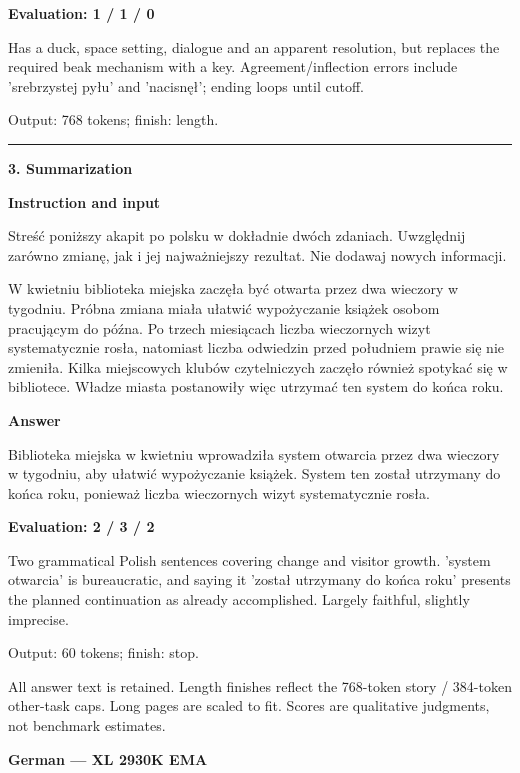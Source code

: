 \documentclass[10pt]{article}
\begin{document}
{\begin{minipage}{\textwidth}
\textbf{Evaluation: 1 / 1 / 0}\par Has a duck, space setting, dialogue and an apparent resolution, but replaces the required beak mechanism with a key. Agreement/inflection errors include 'srebrzystej pyłu' and 'nacisnęł'; ending loops until cutoff.
\par {\color{gray} Output: 768 tokens; finish: length.}\par
\medskip\hrule\smallskip
{\bfseries 3. Summarization}\par\smallskip
\textbf{Instruction and input}\par Streść poniższy akapit po polsku w dokładnie dwóch zdaniach. Uwzględnij zarówno zmianę, jak i jej najważniejszy rezultat. Nie dodawaj nowych informacji.
\par\smallskip
W kwietniu biblioteka miejska zaczęła być otwarta przez dwa wieczory w tygodniu. Próbna zmiana miała ułatwić wypożyczanie książek osobom pracującym do późna. Po trzech miesiącach liczba wieczornych wizyt systematycznie rosła, natomiast liczba odwiedzin przed południem prawie się nie zmieniła. Kilka miejscowych klubów czytelniczych zaczęło również spotykać się w bibliotece. Władze miasta postanowiły więc utrzymać ten system do końca roku.\par\smallskip
\textbf{Answer}\par Biblioteka miejska w kwietniu wprowadziła system otwarcia przez dwa wieczory w tygodniu, aby ułatwić wypożyczanie książek. System ten został utrzymany do końca roku, ponieważ liczba wieczornych wizyt systematycznie rosła.\par\smallskip
\textbf{Evaluation: 2 / 3 / 2}\par Two grammatical Polish sentences covering change and visitor growth. 'system otwarcia' is bureaucratic, and saying it 'został utrzymany do końca roku' presents the planned continuation as already accomplished. Largely faithful, slightly imprecise.
\par {\color{gray} Output: 60 tokens; finish: stop.}\par
\medskip\footnotesize All answer text is retained. Length finishes reflect the 768-token story / 384-token other-task caps. Long pages are scaled to fit. Scores are qualitative judgments, not benchmark estimates.
\end{minipage}}%
\noindent\ifdim\dimexpr\ht\languagepage+\dp\languagepage\relax>0.93\textheight%
\resizebox*{!}{0.93\textheight}{\usebox{\languagepage}}%
\else\usebox{\languagepage}\fi%
\clearpage
{\Large\bfseries German --- XL 2930K EMA}\par\smallskip
\end{document}
